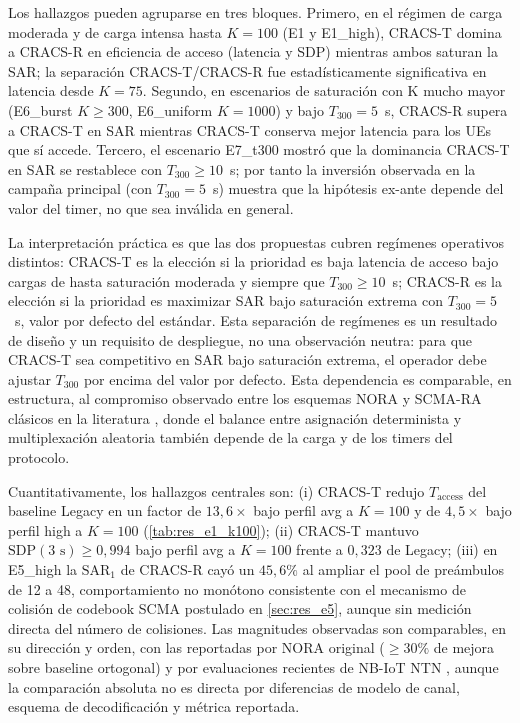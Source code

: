 Los hallazgos pueden agruparse en tres bloques. Primero, en el régimen de carga moderada y de carga intensa hasta $K=100$ (E1 y E1\_high), CRACS-T domina a CRACS-R en eficiencia de acceso (latencia y SDP) mientras ambos saturan la SAR; la separación CRACS-T/CRACS-R fue estadísticamente significativa en latencia desde $K=75$. Segundo, en escenarios de saturación con K mucho mayor (E6\_burst $K \geq 300$, E6\_uniform $K=1000$) y bajo $T_{300}=5$~s, CRACS-R supera a CRACS-T en SAR mientras CRACS-T conserva mejor latencia para los UEs que sí accede. Tercero, el escenario E7\_t300 mostró que la dominancia CRACS-T en SAR se restablece con $T_{300} \geq 10$~s; por tanto la inversión observada en la campaña principal (con $T_{300}=5$~s) muestra que la hipótesis ex-ante depende del valor del timer, no que sea inválida en general.

La interpretación práctica es que las dos propuestas cubren regímenes operativos distintos: CRACS-T es la elección si la prioridad es baja latencia de acceso bajo cargas de hasta saturación moderada y siempre que $T_{300} \geq 10$~s; CRACS-R es la elección si la prioridad es maximizar SAR bajo saturación extrema con $T_{300}=5$~s, valor por defecto del estándar. Esta separación de regímenes es un resultado de diseño y un requisito de despliegue, no una observación neutra: para que CRACS-T sea competitivo en SAR bajo saturación extrema, el operador debe ajustar $T_{300}$ por encima del valor por defecto. Esta dependencia es comparable, en estructura, al compromiso observado entre los esquemas NORA y SCMA-RA clásicos en la literatura \cite{ref5,ref37}, donde el balance entre asignación determinista y multiplexación aleatoria también depende de la carga y de los timers del protocolo.

Cuantitativamente, los hallazgos centrales son: (i) CRACS-T redujo $T_{\text{access}}$ del baseline Legacy en un factor de $13{,}6\times$ bajo perfil avg a $K=100$ y de $4{,}5\times$ bajo perfil high a $K=100$ (\cref{tab:res_e1_k100}); (ii) CRACS-T mantuvo $\mathrm{SDP}(3\text{~s}) \geq 0{,}994$ bajo perfil avg a $K=100$ frente a $0{,}323$ de Legacy; (iii) en E5\_high la $\mathrm{SAR}_{1}$ de CRACS-R cayó un $45{,}6\%$ al ampliar el pool de preámbulos de 12 a 48, comportamiento no monótono consistente con el mecanismo de colisión de codebook SCMA postulado en \cref{sec:res_e5}, aunque sin medición directa del número de colisiones. Las magnitudes observadas son comparables, en su dirección y orden, con las reportadas por NORA original \cite{ref5} ($\geq 30\%$ de mejora sobre baseline ortogonal) y por evaluaciones recientes de NB-IoT NTN \cite{ref23,ref36}, aunque la comparación absoluta no es directa por diferencias de modelo de canal, esquema de decodificación y métrica reportada.

